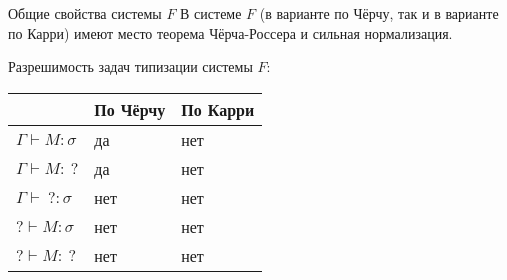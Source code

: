 \documentclass[aspectratio=169]{beamer}
\begin{document}
\begin{frame}{Общие свойства системы $F$}
В системе $F$ (в варианте по Чёрчу, так и в варианте по Карри) имеют место теорема Чёрча-Россера и сильная нормализация.\vspace{0.5cm}

Разрешимость задач типизации системы $F$:

\begin{center}\begin{tabular}{l|ll}
 & По Чёрчу & По Карри \\\hline
$\Gamma \vdash M:\sigma$ & да & нет\\
$\Gamma \vdash M:\ ?$ & да & нет\\
$\Gamma \vdash\ ? : \sigma$ & нет & нет\\
$? \vdash M:\sigma$ & нет & нет\\
$? \vdash M :\ ?$ & нет & нет
\end{tabular}\end{center}
\end{frame}
\end{document}
